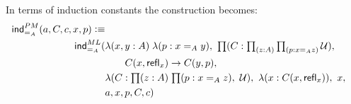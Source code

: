 In terms of induction constants the construction becomes:
\begin{align*}
\ind{=_A}^{PM}(a,C,c,x,p) \defeq \\
\ind{=_A}^{ML}( & \lam{x,y:A}{p:x =_A y} \prd{C : \prd{z:A}{p : x =_A z} \UU} \\
&\qquad C(x,\refl{x}) \to C(y,p),\\
& \lam{C:\prd{z:A}{p : x =_A z} \UU}\lam{x:C(x,\refl{x})} x,\\
& a,x,p,C,c) 
\end{align*}
  





